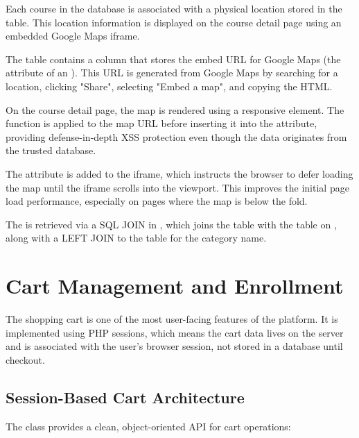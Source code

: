 \documentclass[12pt,a4paper]{report}
\begin{document}
Each course in the database is associated with a physical location stored in the  table. This location information is displayed on the course detail page using an embedded Google Maps iframe.

The  table contains a  column that stores the embed URL for Google Maps (the  attribute of an ). This URL is generated from Google Maps by searching for a location, clicking "Share", selecting "Embed a map", and copying the HTML.

On the course detail page, the map is rendered using a responsive  element. The  function is applied to the map URL before inserting it into the  attribute, providing defense-in-depth XSS protection even though the data originates from the trusted database.

The  attribute is added to the iframe, which instructs the browser to defer loading the map until the iframe scrolls into the viewport. This improves the initial page load performance, especially on pages where the map is below the fold.

The  is retrieved via a SQL JOIN in , which joins the  table with the  table on , along with a LEFT JOIN to the  table for the category name.

\section{Cart Management and Enrollment}

The shopping cart is one of the most user-facing features of the platform. It is implemented using PHP sessions, which means the cart data lives on the server and is associated with the user's browser session, not stored in a database until checkout.

\subsection{Session-Based Cart Architecture}

The  class provides a clean, object-oriented API for cart operations:
\end{document}
